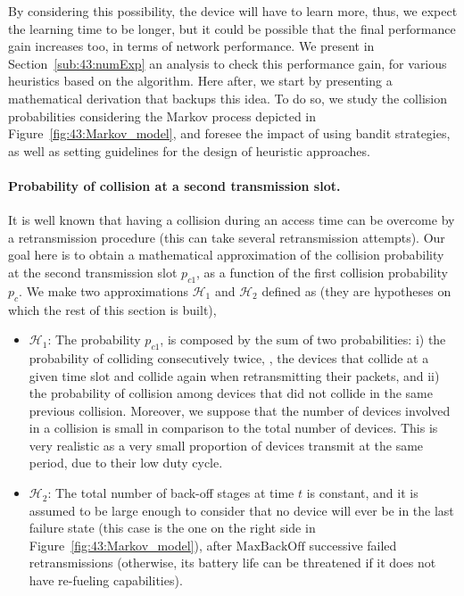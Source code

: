 By considering this possibility, the device will have to learn more, thus, we expect the learning time to be longer, but it could be possible that the final performance gain increases too, in terms of network performance.
We present in Section~\ref{sub:43:numExp} an analysis to check this performance gain, for various heuristics based on the \UCB{} algorithm.
%
Here after, we start by presenting a mathematical derivation that backups this idea.
To do so, we study the collision probabilities considering the Markov process depicted in Figure~\ref{fig:43:Markov_model}, and foresee the impact of using bandit strategies, as well as setting guidelines for the design of heuristic approaches.


\paragraph{Probability of collision at a second transmission slot.}

It is well known \cite{Abramson1970,Roberts75}
that having a collision during an access time can be overcome by a retransmission procedure (this can take several retransmission attempts).
Our goal here is to obtain a mathematical approximation of the collision probability at the second transmission slot $p_{c1}$, as a function of the first collision probability $p_{c}$.
%
We make two approximations $\mathcal{H}_{1}$ and $\mathcal{H}_{2}$ defined as (they are hypotheses on which the rest of this section is built),
\begin{itemize}
	\item $\mathcal{H}_{1}$:
    The probability $p_{c1}$, is composed by the sum of two probabilities: i)
    the probability of colliding consecutively twice, \ie, the devices that collide at a given time slot and collide again when retransmitting their packets,
	and ii) the probability of collision among devices that did not collide in the same previous collision. Moreover, we suppose that the number of devices involved in a collision is small in comparison to the total number of devices.
	This is very realistic as a very small proportion of devices transmit at the same period, due to their low duty cycle.

	\item $\mathcal{H}_{2}$:
	The total number of back-off stages at time $t$ is constant, and it is assumed to be large enough to consider that no device will ever be in the last failure state (this case is the one on the right side in Figure~\ref{fig:43:Markov_model}), after $\mathrm{MaxBackOff}$ successive failed retransmissions
	(otherwise, its battery life can be threatened if it does not have re-fueling capabilities).
\end{itemize}

